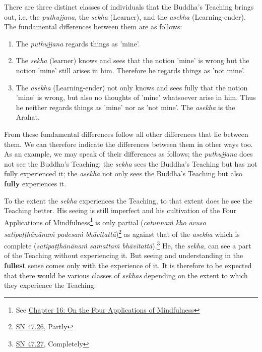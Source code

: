 There are three distinct classes of individuals that the Buddha’s
Teaching brings out, i.e. the \emph{puthujjana}, the \emph{sekha} (Learner), and
the \emph{asekha} (Learning-ender). The fundamental differences between them
are as follows:


\begin{enumerate}

\item{The \emph{puthujjana} regards things as 'mine'.}

\item{The \emph{sekha} (learner) knows and sees that the notion 'mine' is wrong
but the notion 'mine' still arises in him. Therefore he regards things
as 'not mine'.}

\item{The \emph{asekha} (Learning-ender) not only knows and sees fully that the
notion 'mine' is wrong, but also no thoughts of 'mine' whatsoever arise
in him. Thus he neither regards things as 'mine' nor as 'not mine'. The
\emph{asekha} is the Arahat.}

\end{enumerate}


From these fundamental differences follow all other differences that lie
between them. We can therefore indicate the differences between them in
other ways too. As an example, we may speak of their differences as
follows; the \emph{puthujjana} does not see the Buddha’s Teaching; the
\emph{sekha} sees the Buddha’s Teaching but has not fully experienced it; the
\emph{asekha} not only sees the Buddha’s Teaching but also \textbf{fully}
experiences it.


To the extent the \emph{sekha} experiences the Teaching, to that extent does
he see the Teaching better. His seeing is still imperfect and his
cultivation of the Four Applications of Mindfulness\footnote{See \hyperlink{ch-16-satipatthana#start}{Chapter 16: On the Four Applications of Mindfulness}} is only partial
(\emph{catunnaṁ kho āvuso satipaṭṭhānānaṁ padesaṁ bhāvitattā})\footnote{\href{https://suttacentral.net/sn47.26/en/bodhi}{SN 47.26}, Partly}
as against that of the \emph{asekha} which is complete (\emph{satipaṭṭhānānaṁ samattaṁ bhāvitattā}).\footnote{\href{https://suttacentral.net/sn47.27/en/bodhi}{SN 47.27}, Completely}
He, the \emph{sekha}, can see a part of the
Teaching without experiencing it. But seeing and understanding in the
\textbf{fullest} sense comes only with the experience of it. It is therefore to
be expected that there would be various classes of \emph{sekhas} depending on
the extent to which they experience the Teaching.


